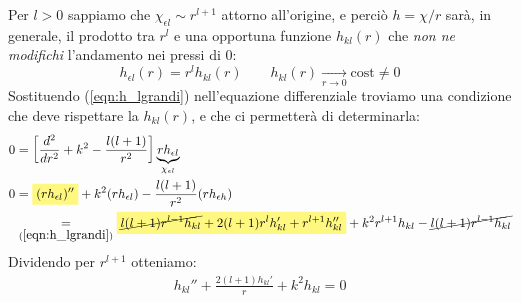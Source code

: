 \documentclass[../../FisicaTeorica.tex]{subfiles}
\begin{document}
Per $l>0$ sappiamo che $\chi_{\epsilon l} \sim r^{l+1}$ attorno all'origine, e perciò $h=\chi/r$ sarà, in generale, il prodotto tra $r^l$ e una opportuna funzione $h_{kl}(r)$ che \textit{non ne modifichi} l'andamento nei pressi di $0$: 
\begin{equation}
h_{\epsilon l}(r) = r^l h_{kl}(r)\qquad h_{kl}(r) \xrightarrow[r \to 0]{} \text{cost}\neq 0
\label{eqn:h_lgrandi}
\end{equation}
Sostituendo (\ref{eqn:h_lgrandi}) nell'equazione differenziale troviamo una condizione che deve rispettare la $h_{kl}(r)$, e che ci permetterà di determinarla:
\begin{align*}0 &=
\left[\frac{d^2}{dr^2} + k^2 -\frac{l(l+1)}{r^2}\right] \underbrace{rh_{\epsilon l}}_{\chi_{\epsilon l}}\\
0 &= \hlc{Yellow}{(rh_{\epsilon l})''}+k^2(r h_{\epsilon l})-\frac{l(l+1)}{r^2}(rh_{\epsilon h})\\ &\underset{(\ref{eqn:h_lgrandi})}{=} \hlc{Yellow}{\cancel{l(l+1)r^{l-1} h_{kl} }+ 2(l+1) r^l h_{kl}' + r^{l+1}h_{kl}'' }+ k^2 r^{l+1}h_{kl} -\cancel{ l(l+1)r^{l-1}h_{kl}}
\end{align*}
Dividendo per $r^{l+1}$ otteniamo:
\begin{align}
h_{kl}'' + \frac{2(l+1) h_{kl}'}{r} + k^2 h_{kl} = 0
\label{eqn:hkl1}
\end{align}
\end{document}
